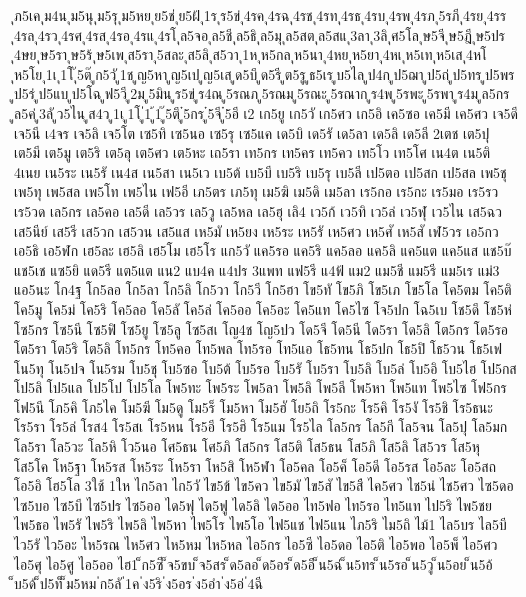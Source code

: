 {ุภ5เค
ุม4น
ุม5นุ
ุม5รุ
ุม5หย
ุย5ช่
ุย5ฝ้
ุ1ร
ุร5ข่
ุ4รค
ุ4รฉ
ุ4รช
ุ4รท
ุ4รธ
ุ4รบ
ุ4รพ
ุ4รภ
ุ5รภี
ุ4รย
ุ4รร
ุ4รล
ุ4รว
ุ4รศ
ุ4รส
ุ4รอ
ุ4รแ
ุ4รโ
ุล5จอ
ุล5ชี
ุล5ธิ
ุล5มุ
ุล5สต
ุล5สแ
ุ3ลา
ุ3ลิ
ุศ5โล
ุษ5จี
ุษ5ฎี
ุษ5ปร
ุ4ษย
ุษ5รา
ุษ5ร้
ุษ5เพ
ุส5รา
ุ5สละ
ุส5ลิ
ุส5วา
ุ1ห
ุห5กล
ุห5นา
ุ4หย
ุห5ยา
ุ4หเ
ุห5เท
ุห5เส
ุ4หโ
ุห5โย
ุ1เ
ุ1โ
ุ๊5ต๊
ูก5วั
ู1ช
ูญ5หา
ูญ5เป
ูญ5เส
ูด5บึ
ูด5รี
ูต5รู
ูธ5เร
ูบ5ไล
ูป4ก
ูป5ฌา
ูป5ถ่
ูป5ทร
ูป5พร
ูป5ร่
ูป5แบ
ูป5โฉ
ูฟ5วี
ู2ม
ู5มิน
ูร5ข่
ูร4ณ
ู5รณภ
ู5รณม
ู5รณะ
ู5รณาก
ูร4พ
ู5รพะ
ู5รพา
ูร4ม
ูล5กร
ูล5ค่
ู3ลั
ูว5ไน
ูส4ว
ู1เ
ู1โ
ู่1
ู้1
ู๊5ตึ
ู๋5กร
ู๋5จี
ู๋5อี
เ2
เก5ยู
เก5วั
เก5ศว
เก5อิ
เค5ซอ
เค5มี
เค5ศว
เจ5ดี
เจ5นี
เ4จร
เจ5ลิ
เจ5โต
เซ5ทิ
เซ5นอ
เซ5รุ
เซ5แค
เด5บิ
เด5รั
เด5ลา
เด5ลิ
เด5ลี
2เตช
เต5ปุ
เต5มี
เต5มู
เต5ริ
เต5ลุ
เต5ศว
เต5หะ
เถ5รา
เท5กร
เท5คร
เท5คว
เท5โว
เท5โศ
เน4ต
เน5ติ
4เนย
เน5ระ
เน5รั
เน4ส
เน5สา
เน5เว
เบ5ต้
เบ5บี
เบ5ริ
เบ5รุ
เบ5ลี
เป5ตอ
เป5สก
เป5สล
เพ5ชุ
เพ5ทุ
เพ5สล
เพ5โท
เพ5ไน
เฟ5อี
เภ5ตร
เภ5ทุ
เม5ฆิ
เม5ดิ
เม5ลา
เร5กอ
เร5กะ
เร5มอ
เร5รว
เร5วด
เล5กร
เล5คอ
เล5ดี
เล5วร
เล5วู
เล5หล
เล5ฮุ
เลิ4
เว5ก้
เว5ทิ
เว5ล่
เว5ฬุ
เว5ไน
เส5ฉว
เส5นีย์
เส5รี
เส5วก
เส5วน
เส5แส
เห5มั
เห5ยง
เห5ระ
เห5รั
เห5ศว
เห5ศั
เห5สั
เฬ5วร
เอ5กว
เอ5ธิ
เอ5ฬก
เฮ5ละ
เฮ5ลิ
เฮ5โม
เฮ5โร
แก5วั
แค5รอ
แค5ริ
แค5ลอ
แค5ลิ
แค5แต
แค5แส
แช5บ๊
แช5เช
แซ5ยิ
แด5รี
แต5แต
แน2
แบ4ค
แ4ปร
3แพท
แฟ5รี
แ4ฟ้
แม2
แม5ชี
แม5รี
แม5เร
แม่3
แอ5นะ
โก4ฐ
โก5ลอ
โก5ลา
โก5ลิ
โก5วา
โก5วี
โก5ฮา
โข5ทั
โข5ภิ
โข5เภ
โข5โล
โค5ตม
โค5ติ
โค5มู
โค5ม่
โค5ริ
โค5ลอ
โค5ลั
โค5ล่
โค5ออ
โค5อะ
โค5แท
โค5ไซ
โจ5ปก
โฉ5เบ
โช5ดึ
โช5ห่
โซ5กร
โซ5นี
โซ5ฟิ
โซ5ยู
โซ5ลู
โซ5สเ
โญ4ช
โญ5ปว
โด5จี
โด5นี
โด5รา
โด5ลิ
โต5กร
โต5รอ
โต5รา
โต5ริ
โต5ลิ
โท5กร
โท5คอ
โท5พล
โท5รอ
โท5แอ
โธ5ทน
โธ5ปก
โธ5ปิ
โธ5วน
โธ5เฟ
โน5ทุ
โน5ปจ
โน5รม
โบ5ชุ
โบ5ซอ
โบ5ต้
โบ5รอ
โบ5รั
โบ5รา
โบ5ลิ
โบ5ล่
โบ5อิ
โบ5ไฮ
โป5กส
โป5ลิ
โป5แล
โป5โป
โป5โล
โพ5ทะ
โพ5ระ
โพ5ลา
โพ5ลิ
โพ5ลี
โพ5หา
โพ5แท
โพ5ไซ
โฟ5กร
โฟ5นี
โภ5คิ
โภ5ไค
โม5ฆี
โม5ดู
โม5ร็
โม5หา
โม5ฮั
โย5ถิ
โร5กะ
โร5คิ
โร5งั
โร5ชิ
โร5ธนะ
โร5รา
โร5ล่
โรส4
โร5สเ
โร5หน
โร5อี
โร5ฮิ
โร5แม
โร5ไล
โล5กร
โล5กี
โล5จน
โล5ปุ
โล5มก
โล5รา
โล5วะ
โล5หิ
โว5นอ
โศ5ธน
โศ5ภิ
โส5กร
โส5ติ
โส5ธน
โส5ภิ
โส5ลิ
โส5วร
โส5หุ
โส5โค
โห5ฐา
โห5รส
โห5ระ
โห5รา
โห5สิ
โห5ฬา
โอ5คล
โอ5ค็
โอ5ดี
โอ5รส
โอ5ละ
โอ5สถ
โอ5อิ
โฮ5โล
3ใช้
1ให
ไก5ลา
ไก5วั
ไข5ข้
ไข5คว
ไข5มั
ไข5สั
ไข5สื
ไค5ศว
ไช5น่
ไช5ศว
ไซ5ดอ
ไซ5บอ
ไซ5บี
ไซ5ปร
ไซ5ออ
ได5ฟุ
ได5ฟู
ได5ลิ
ได5ออ
ไท5ฟอ
ไท5รอ
ไท5แท
ไป5ริ
ไพ5ชย
ไพ5ธอ
ไพ5รั
ไพ5ริ
ไพ5ลิ
ไพ5หา
ไพ5โร
ไพ5โอ
ไฟ5แช
ไฟ5แน
ไภ5ริ
ไม5ถิ
ไม้1
ไล5บร
ไล5บี
ไว5รั
ไว5อะ
ไห5รณ
ไห5ศว
ไห5หม
ไห5หล
ไอ5กร
ไอ5ซี
ไอ5ดอ
ไอ5ติ
ไอ5พอ
ไอ5พ็
ไอ5ศว
ไอ5ศุ
ไอ5ศู
ไอ5ออ
ไฮ1
็ก5ซี
็จ5ขบ
็จ5สร
็ด5ลอ
็ด5อร
็ด5อึ
็น5ฉ่
็น5ทร
็น5รอ
็น5วู
็น5อย
็น5อ้
็บ5ด้
็ป5ท็
็ม5หม
่ก5ลั
่1ค
่ง5ริ
่ง5อร
่ง5อำ
่ง5อ่
่4ฉี
}
